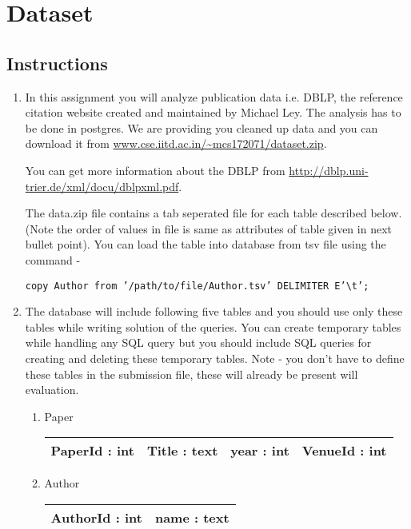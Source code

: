 \documentclass[10pt]{article}
\begin{document}
\section{Dataset}

\subsection{Instructions}

\begin{enumerate}

\item In this assignment you will analyze publication data i.e. DBLP, the reference citation website created and maintained by Michael Ley. The analysis has to  be done in postgres. We are providing you cleaned up data and you can download it from \url{www.cse.iitd.ac.in/~mcs172071/dataset.zip}.

You can get more information about the DBLP from \url{http://dblp.uni-trier.de/xml/docu/dblpxml.pdf}.

The data.zip file contains a tab seperated file for each table described below.(Note the order of values in file is same as attributes of table given in next bullet point). You can load the table into database from tsv file using the command -

{\tt copy Author from '/path/to/file/Author.tsv' DELIMITER E'\textbackslash t';}

\item The database will include following five tables and you should use only these tables while writing solution of the queries. You can create temporary tables while handling any SQL query but you should include SQL queries for creating and deleting these temporary tables. Note - you don't have to define these tables in the submission file, these will already be present will evaluation.


\begin{enumerate}
\item Paper\\
        \begin{tabular}{|c|c|c|c|}
            \hline
             PaperId : int & Title : text & year : int & VenueId : int\\
            \hline
        \end{tabular}
\item Author\\
        \begin{tabular}{|c|c|}
            \hline
             AuthorId : int & name : text \\
            \hline
        \end{tabular}


\end{enumerate}
\end{enumerate}
\end{document}
